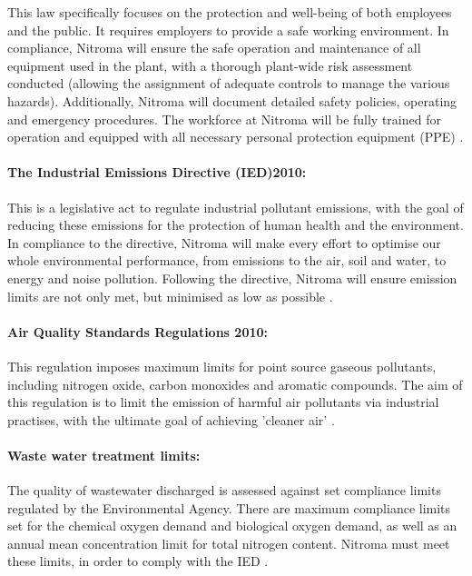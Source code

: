 This law specifically focuses on the protection and well-being of both employees and the public. It requires employers to provide a safe working environment. In compliance, Nitroma will ensure the safe operation and maintenance of all equipment used in the plant, with a thorough plant-wide risk assessment conducted (allowing the assignment of adequate controls to manage the various hazards). Additionally, Nitroma will document detailed safety policies, operating and emergency procedures. The workforce at Nitroma will be fully trained for operation and equipped with all necessary personal protection equipment (PPE) \cite{british_safety_council_health_nodate}.

\paragraph{The Industrial Emissions Directive (IED)2010:}

This is a legislative act to regulate industrial pollutant emissions, with the goal of reducing these emissions for the protection of human health and the environment. In compliance to the directive, Nitroma will make every effort to optimise our whole environmental performance, from emissions to the air, soil and water, to energy and noise pollution. Following the directive, Nitroma will ensure emission limits are not only met, but minimised as low as  possible \cite{european_commission_industrial_nodate}. 

\paragraph{Air Quality Standards Regulations 2010:}

This regulation imposes maximum limits for point source gaseous pollutants, including nitrogen oxide, carbon monoxides and aromatic compounds. The aim of this regulation is to limit the emission of harmful air pollutants via industrial practises, with the ultimate goal of achieving 'cleaner air' \cite{tilling_meeting_2017}.  

\paragraph{Waste water treatment limits:}

The quality of wastewater discharged is assessed against set compliance limits regulated by the Environmental Agency. There are maximum compliance limits set for the chemical oxygen demand and biological oxygen demand, as well as an annual mean concentration limit for total nitrogen content. Nitroma must meet these limits, in order to comply with the IED \cite{environment_agency_waste_nodate}. 

